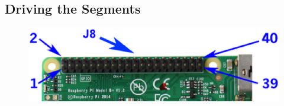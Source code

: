 \subsection{Driving the Segments}
\begin{problem}
\end{problem}	
\renewcommand{\thefigure}{\theproblem.\arabic{figure}}
\begin{figure}[!ht]
\begin{center}
\includegraphics[width=\columnwidth]{./figs/gpio2}
\end{center}
\label{fig_1_3a}	
\end{figure}
%
